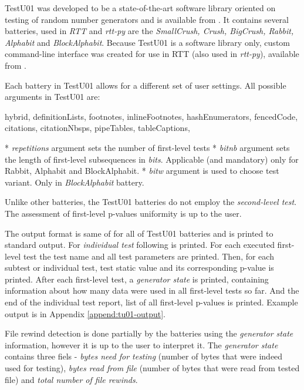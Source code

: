 \documentclass[
  digital,     %
  oneside,     %
  nosansbold,  %
  nocolorbold, %
  nolof,         %
  nolot,         %
]{fithesis4}
\begin{document}
TestU01 was developed to be a state-of-the-art software library oriented on testing of random number generators and is available from \cite{tu01_site}. It contains several batteries, used in \emph{RTT} and \emph{rtt-py} are the \emph{SmallCrush, Crush, BigCrush, Rabbit, Alphabit} and \emph{BlockAlphabit}. Because TestU01 is a software library only, custom command-line interface was created for use in RTT (also used in \emph{rtt-py}), available from \cite{rtt-batteries}.

Each battery in TestU01 allows for a different set of user settings. All possible arguments in TestU01 are:
\begin{markdown*}{%
  hybrid,
  definitionLists,
  footnotes,
  inlineFootnotes,
  hashEnumerators,
  fencedCode,
  citations,
  citationNbsps,
  pipeTables,
  tableCaptions,
}

* \emph{repetitions} argument sets the number of first-level tests
* \emph{bit\textunderscore nb} argument sets the length of first-level subsequences in \emph{bits}. Applicable (and mandatory) only for Rabbit, Alphabit and BlockAlphabit.
* \emph{bit\textunderscore w} argument is used to choose test variant. Only in \emph{BlockAlphabit} battery.
\end{markdown*}
Unlike other batteries, the TestU01 batteries do not employ the \emph{second-level test}. The assessment  of first-level p-values uniformity is up to the user. 

The output format is same of for all of TestU01 batteries and is printed to standard output. For \emph{individual test} following is printed. For each executed first-level test the test name and all test parameters are printed. Then, for each subtest or individual test, test static value and its corresponding p-value is printed. After each first-level test, a \emph{generator state} is printed, containing information about how many data were used in all first-level tests so far. And the end of the individual test report, list of all first-level p-values is printed. Example output is in Appendix \ref{append:tu01-output}.

File rewind detection is done partially by the batteries using the \emph{generator state} information, however it is up to the user to interpret it. The \emph{generator state} contains three fiels - \emph{bytes need for testing} (number of bytes that were indeed used for testing), \emph{bytes read from file} (number of bytes that were read from tested file) and \emph{total number of file rewinds}. 
\end{document}
